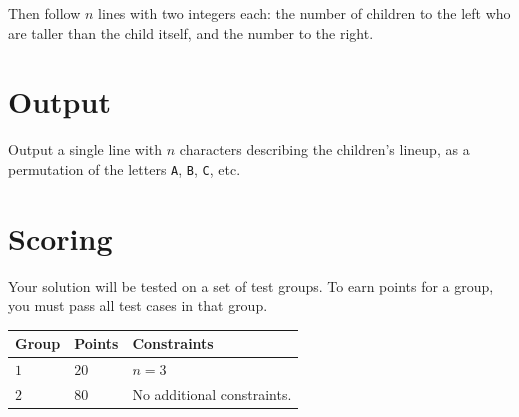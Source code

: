 Then follow $n$ lines with two integers each: the number of children to the left who are taller than the child itself, and the number to the right.

\section*{Output}
Output a single line with $n$ characters describing the children's lineup, as a permutation of the letters \texttt{A}, \texttt{B}, \texttt{C}, etc.

\section*{Scoring}
Your solution will be tested on a set of test groups.
To earn points for a group, you must pass all test cases in that group.


\noindent
\begin{tabular}{| l | l | p{12cm} |}
  \hline
  \textbf{Group} & \textbf{Points} & \textbf{Constraints} \\ \hline
  $1$    & $20$       & $n = 3$ \\ \hline
  $2$    & $80$       & No additional constraints. \\ \hline
\end{tabular}

